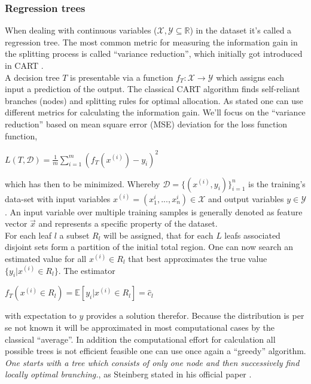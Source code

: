 \documentclass[12pt, a4paper]{article}
\begin{document}
\subsubsection{Regression trees}
\label{sec: decision_trees}
When dealing with continuous variables ($\mathcal{X, Y} \subseteq \mathbb{R}$) in the dataset it's called a regression tree. The most common metric for measuring the information gain in the splitting process is called ``variance reduction'', which initially got introduced in CART \cite{Breiman1984}. \\
A decision tree $T$ is presentable via a function $f_T : \mathcal{X} \rightarrow \mathcal{Y}$ which assigns each input a prediction of the output. The classical CART algorithm \cite{Breiman1984} finds self-reliant branches (nodes) and splitting rules for optimal allocation. As stated one can use different metrics for calculating the information gain. We'll focus on the ``variance reduction'' based on mean square error (MSE) deviation for the loss function function,
\begin{center}
    $L(T,\mathcal{D}) = \frac{1}{m} \sum_{i=1}^m (f_T(x^{(i)}) - y_i)^2$
\end{center}
which has then to be minimized. Whereby $\mathcal{D} = \{(x^{(i)},y_i)\}_{i=1}^n$ is the training's data-set with input variables $x^{(i)} = (x_1^{i} ,...,x_n^{i}) \in \mathcal{X}$ and output variables $y \in \mathcal{Y}$. An input variable over multiple training samples is generally denoted as feature vector $\vec{x}$ and represents a specific property of the dataset. \\
For each leaf $l$ a subset $R_l$ will be assigned, that for each $L$ leafs associated disjoint sets form a partition of the initial total region. One can now search an estimated value for all $x^{(i)} \in R_l$ that best approximates the true value $\{y_i | x^{(i)} \in R_l\}$.
The estimator
\begin{center}
    $f_T(x^{(i)} \in R_l) = \mathbb{E}[y_i | x^{(i)} \in R_l] = \hat{c}_l$
\end{center}
with expectation to $y$ provides a solution therefor. Because the distribution is per se not known it will be approximated in most computational cases by the classical ``average''.
In addition the computational effort for calculation all possible trees is not efficient feasible one can use once again a ``greedy'' algorithm.
\textit{One starts with a tree which consists of only one node and then successively find locally optimal branching.}, as Steinberg stated in his official paper \cite{Steinberg2009}. \\
\end{document}
